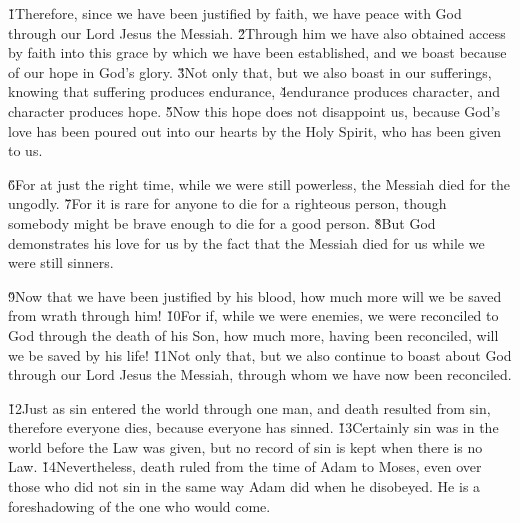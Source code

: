 \v{1}Therefore, since we have been justified by faith, we have peace with God through our Lord Jesus the Messiah. \v{2}Through him we have also obtained access by faith into this grace by which we have been established, and we boast because of our hope in God's glory. \v{3}Not only that, but we also boast in our sufferings, knowing that suffering produces endurance, \v{4}endurance produces character, and character produces hope. \v{5}Now this hope does not disappoint us, because God's love has been poured out into our hearts by the Holy Spirit, who has been given to us.

\v{6}For at just the right time, while we were still powerless, the Messiah died for the ungodly. \v{7}For it is rare for anyone to die for a righteous person, though somebody might be brave enough to die for a good person. \v{8}But God demonstrates his love for us by the fact that the Messiah died for us while we were still sinners.

\v{9}Now that we have been justified by his blood, how much more will we be saved from wrath through him! \v{10}For if, while we were enemies, we were reconciled to God through the death of his Son, how much more, having been reconciled, will we be saved by his life! \v{11}Not only that, but we also continue to boast about God through our Lord Jesus the Messiah, through whom we have now been reconciled.

\v{12}Just as sin entered the world through one man, and death resulted from sin, therefore everyone dies, because everyone has sinned. \v{13}Certainly sin was in the world before the Law was given, but no record of sin is kept when there is no Law. \v{14}Nevertheless, death ruled from the time of Adam to Moses, even over those who did not sin in the same way Adam did when he disobeyed. He is a foreshadowing of the one who would come.

